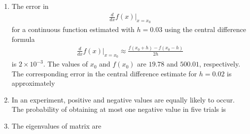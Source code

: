 \documentclass[journal]{IEEEtran}
\begin{document}
\begin{enumerate}
\item The error in 
\begin{align}
    \frac{d}{dx}f(x)\bigg|_{x=x_0}
\end{align} 
for a continuous function estimated with $h=0.03$ using the central difference formula
\begin{align}
\frac{d}{dx}f(x)\bigg|_{x=x_0}\approx\frac{f(x_0+h)-f(x_0-h)}{2h}
\end{align}
is $2\times10^{-3}$. The values of $x_0$ and $f(x_0)$ are $19.78$ and $500.01$, respectively. The corresponding error in the central difference estimate for $h=0.02$ is approximately \hfill {}
\begin{enumerate}
\end{enumerate}

\item In an experiment, positive and negative values are equally likely to occur. The probability of obtaining at most one negative value in five trials is \hfill {}
\begin{enumerate}
\end{enumerate}

\item The eigenvalues of matrix  are \hfill {}
\begin{enumerate}
\end{enumerate}


\end{enumerate}
\end{document}
